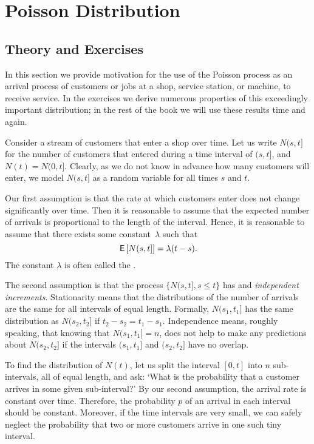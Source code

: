 \section{Poisson Distribution}
\label{sec:poisson-distribution}

\subsection*{Theory and Exercises}



In this section we provide motivation for the use of the Poisson process as an arrival process of customers or jobs at a shop, service station, or machine, to receive service.  In the exercises we derive numerous  properties of  this exceedingly important distribution; in the rest of the book we will use these results time and again.

Consider a stream of customers that enter a shop over time. Let us write $N(s, t]$ for
the number of customers that entered during a time interval of $(s,t]$, and $N(t)=N(0,t]$. Clearly, as we do not know in advance how many customers will enter, we model $N(s,t]$ as a random variable for all
times $s$ and $t$.

Our first assumption is that the rate at which customers enter does not
change significantly over time. Then it is reasonable to assume that
the expected number of arrivals is proportional to the  length of
the interval. Hence, it is reasonable to assume that there exists some
constant~$\lambda$ such that
\begin{equation}
  \label{eq:6}
 \,\mathsf{E}\left[N(s,t]\right] = \lambda (t-s).
\end{equation}
The constant $\lambda$ is often called the .


The second assumption is that the process $\{N(s,t], s\leq t\}$ has
 and \emph{independent increments}. Stationarity
means that the distributions of the number of arrivals are the same for
all intervals of equal length. Formally, $N(s_1,t_1]$ has the same
distribution as $N(s_2, t_2]$ if $t_2-s_2 = t_1-s_1$. Independence
means, roughly speaking, that knowing that $N(s_1,t_1]= n$, does not
help to make any predictions about $N(s_2, t_2]$ if the intervals
$(s_1,t_1]$ and $(s_2, t_2]$ have no overlap.

To find the distribution of $N(t)$, let us split the interval
$[0,t]$ into $n$ sub-intervals, all of equal length, and ask: `What is
the probability that a customer arrives in some given
sub-interval?'  By our second assumption, the arrival rate is
constant over time. Therefore, the probability $p$ of an arrival in each
interval should be constant. Moreover,
if the time intervals are very small, we can safely neglect the
probability that two or more customers arrive in one such tiny interval.

